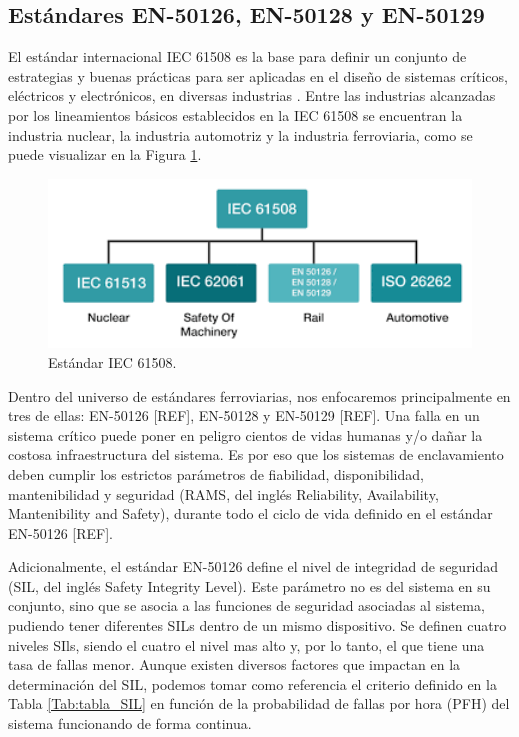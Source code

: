 \subsection{Estándares EN-50126, EN-50128 y EN-50129}

    El estándar internacional IEC 61508 \cite{Paper_71,Paper_72,Paper_73,Paper_74,Paper_75,Paper_76,Paper_77} es la base para definir un conjunto de estrategias y buenas prácticas para ser aplicadas en el diseño de sistemas críticos, eléctricos y electrónicos, en diversas industrias \cite{Paper_26,Paper_29,Paper_30,Paper_31,Paper_34,Paper_47} . Entre las industrias alcanzadas por los lineamientos básicos establecidos en la IEC 61508 se encuentran la industria nuclear, la industria automotriz y la industria ferroviaria, como se puede visualizar en la Figura \ref{fig:IEC_61508}.

    \begin{figure}[h]
        \centering
        \includegraphics[width=1\textwidth]{Figuras/IEC61508.png}
        \centering\caption{Estándar IEC 61508.}
        \label{fig:IEC_61508}
    \end{figure}

    Dentro del universo de estándares ferroviarias, nos enfocaremos principalmente en tres de ellas: EN-50126 [REF], EN-50128 \cite{Paper_70} y EN-50129 [REF]. Una falla en un sistema crítico puede poner en peligro cientos de vidas humanas y/o dañar la costosa infraestructura del sistema. Es por eso que los sistemas de enclavamiento deben cumplir los estrictos parámetros de fiabilidad, disponibilidad, mantenibilidad y seguridad (RAMS, del inglés Reliability, Availability, Mantenibility and Safety), durante todo el ciclo de vida definido en el estándar EN-50126 [REF].

    Adicionalmente, el estándar EN-50126 define el nivel de integridad de seguridad (SIL, del inglés Safety Integrity Level). Este parámetro no es del sistema en su conjunto, sino que se asocia a las funciones de seguridad asociadas al sistema, pudiendo tener diferentes SILs dentro de un mismo dispositivo. Se definen cuatro niveles SIls, siendo el cuatro el nivel mas alto y, por lo tanto, el que tiene una tasa de fallas menor. Aunque existen diversos factores que impactan en la determinación del SIL, podemos tomar como referencia el criterio definido en la Tabla \ref{Tab:tabla_SIL} en función de la probabilidad de fallas por hora (PFH) del sistema funcionando de forma continua.

